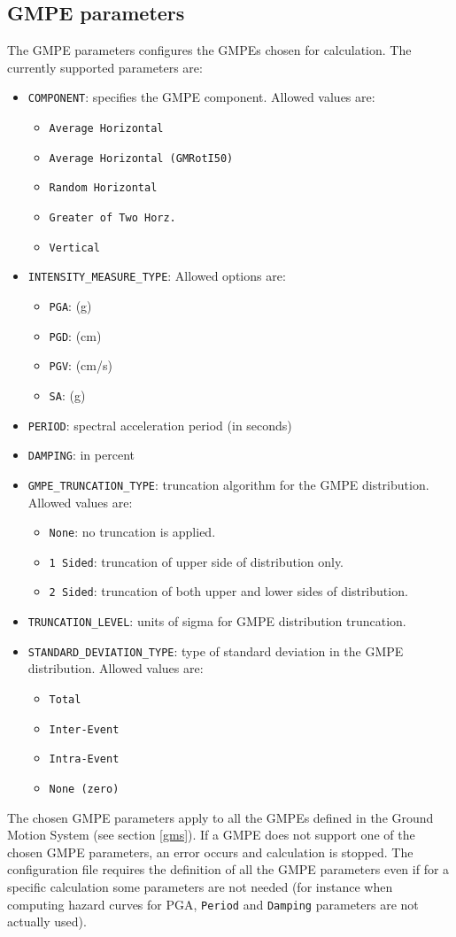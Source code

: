 \subsection{GMPE parameters}
The GMPE parameters configures the GMPEs chosen for calculation. The currently supported parameters are:
\begin{itemize}
\item \Verb+COMPONENT+: specifies the GMPE component. Allowed values are:
\begin{itemize}
\item \Verb+Average Horizontal+
\item \Verb+Average Horizontal (GMRotI50)+
\item \Verb+Random Horizontal+
\item \Verb+Greater of Two Horz.+
\item \Verb+Vertical+
\end{itemize}
\item \Verb+INTENSITY_MEASURE_TYPE+: Allowed options are:
\begin{itemize}
\item \Verb+PGA+: (g)
\item \Verb+PGD+: (cm)
\item \Verb+PGV+: (cm/s)
\item \Verb+SA+: (g)
\end{itemize}
\item \Verb+PERIOD+: spectral acceleration period (in seconds)
\item \Verb+DAMPING+: in percent
\item \Verb+GMPE_TRUNCATION_TYPE+: truncation algorithm for the GMPE distribution. Allowed values are:
\begin{itemize}
\item \Verb+None+: no truncation is applied.
\item \Verb+1 Sided+: truncation of upper side of distribution only.
\item \Verb+2 Sided+: truncation of both upper and lower sides of distribution.
\end{itemize}
\item \Verb+TRUNCATION_LEVEL+: units of sigma for GMPE distribution truncation.
\item \Verb+STANDARD_DEVIATION_TYPE+: type of standard deviation in the GMPE distribution. Allowed values are:
\begin{itemize}
\item \Verb+Total+
\item \Verb+Inter-Event+
\item \Verb+Intra-Event+
\item \Verb+None (zero)+
\end{itemize}
\end{itemize}
The chosen GMPE parameters apply to all the GMPEs defined in the Ground Motion System (see section \ref{gms}). If a GMPE does not support one of the chosen GMPE parameters, an error occurs and calculation is stopped. The configuration file requires the definition of all the GMPE parameters even if for a specific calculation some parameters are not needed (for instance when computing hazard curves for PGA, \Verb+Period+ and \Verb+Damping+ parameters are not actually used).

